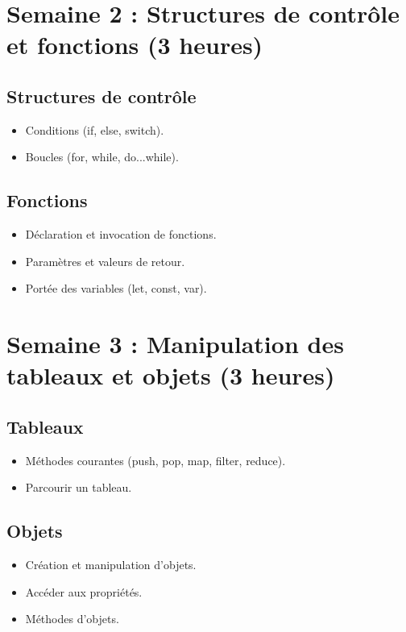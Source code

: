 \documentclass[12pt]{article}
\begin{document}
\section*{Semaine 2 : Structures de contrôle et fonctions (3 heures)}
\subsection*{Structures de contrôle }
\begin{itemize}
    \item Conditions (if, else, switch).
    \item Boucles (for, while, do...while).
\end{itemize}

\subsection*{Fonctions }
\begin{itemize}
    \item Déclaration et invocation de fonctions.
    \item Paramètres et valeurs de retour.
    \item Portée des variables (let, const, var).
\end{itemize}

\section*{Semaine 3 : Manipulation des tableaux et objets (3 heures)}
\subsection*{Tableaux }
\begin{itemize}
    \item Méthodes courantes (push, pop, map, filter, reduce).
    \item Parcourir un tableau.
\end{itemize}

\subsection*{Objets }
\begin{itemize}
    \item Création et manipulation d'objets.
    \item Accéder aux propriétés.
    \item Méthodes d'objets.
\end{itemize}
\end{document}
